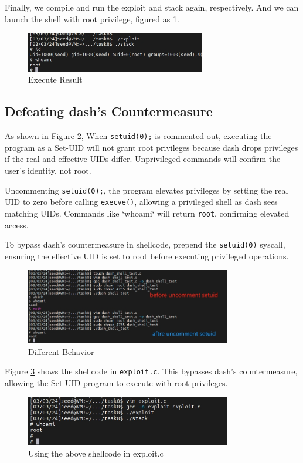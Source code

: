 \documentclass[a4paper,11pt]{article}
\begin{document}
Finally, we compile and run the exploit and stack again, respectively. And we can launch the shell with root privilege, figured as \ref{fig:task10-3}.
\begin{figure}[h]
    \centering
       \includegraphics[width=0.7\textwidth]{figures/task10/task10.4.png}
    \caption{Execute Result}\label{fig:task10-3}
\end{figure}

\subsection{Defeating dash’s Countermeasure}

As shown in Figure \ref{fig:task11.1}, When \verb|setuid(0);| is commented out, executing the program as a Set-UID will not grant root privileges because dash drops privileges if the real and effective UIDs differ. Unprivileged commands will confirm the user's identity, not root.

Uncommenting \verb|setuid(0);|, the program elevates privileges by setting the real UID to zero before calling \verb|execve()|, allowing a privileged shell as dash sees matching UIDs. Commands like `whoami` will return \verb|root|, confirming elevated access.

To bypass dash's countermeasure in shellcode, prepend the \verb|setuid(0)| syscall, ensuring the effective UID is set to root before executing privileged operations.
\begin{figure}[h]
    \centering
       \includegraphics[width=0.8\textwidth]{figures/task11/task11.1.png}
    \caption{Different Behavior}\label{fig:task11.1}
\end{figure}

Figure \ref{fig:task11.2} shows the shellcode in \verb|exploit.c|. This bypasses dash's countermeasure, allowing the Set-UID program to execute with root privileges.
\begin{figure}[h]
    \centering
       \includegraphics[width=0.8\textwidth]{figures/task11/task11.2.png}
    \caption{Using the above shellcode in exploit.c}\label{fig:task11.2}
\end{figure}
\end{document}
